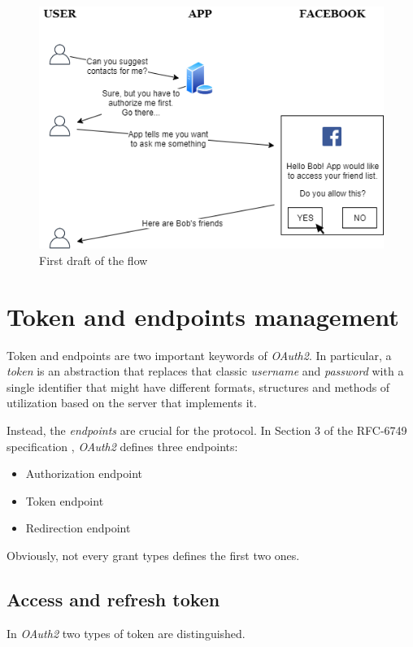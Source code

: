 \begin{figure}
    \centering
    \includegraphics[scale=0.74]{chapters/images/chp2/flow1.png}
    \caption{First draft of the flow}
    \label{fig:flow1}
    \vspace{0.5cm}
\end{figure}

\vspace{1cm}

\section{Token and endpoints management}
Token and endpoints are two important keywords of \textit{OAuth2}. In particular, a \textit{token} is an abstraction that replaces that classic \textit{username} and \textit{password} with a single identifier that might have different formats, structures and methods of utilization based on the server that implements it.

Instead, the \textit{endpoints} are crucial for the protocol. In Section 3 of the RFC-6749 specification \cite{RFC6749}, \textit{OAuth2} defines three endpoints:

\begin{itemize}
    \item Authorization endpoint
    \item Token endpoint
    \item Redirection endpoint
\end{itemize}

Obviously, not every grant types defines the first two ones.

\subsection{Access and refresh token}
\label{accref}
In \textit{OAuth2} two types of token are distinguished.

